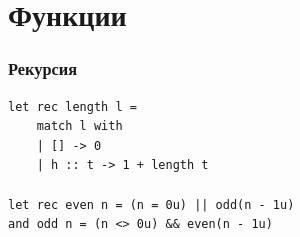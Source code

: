\documentclass[xetex,mathserif,serif]{beamer}
\begin{document}
    \section{Функции}

    \begin{frame}[fragile]
        \frametitle{Рекурсия}
        \begin{verbatim}
let rec length l =
    match l with
    | [] -> 0
    | h :: t -> 1 + length t

let rec even n = (n = 0u) || odd(n - 1u)
and odd n = (n <> 0u) && even(n - 1u)
        \end{verbatim}
    \end{frame}
\end{document}

